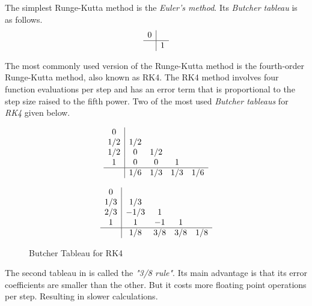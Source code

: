 \documentclass[a4paper,oneside,12pt]{report}
\numberwithin{equation}{chapter}
\begin{document}
The simplest Runge-Kutta method is the \textit{Euler's method}. Its \textit{Butcher tableau} is as follows.
\[ 
    \begin{array} 
        {c|cccc}
        0\\
        \hline
        & 1
    \end{array}
\]


The most commonly used version of the Runge-Kutta method is the fourth-order Runge-Kutta method, also known as RK4. 
The RK4 method involves four function evaluations per step and has an error term that is proportional to the step size raised to the fifth power.
Two of the most used \textit{Butcher tableaus} for \textit{RK4} given below.


\begin{figure}[h!]
    \centering
    \begin{subfigure}{.5\textwidth}
        \[ 
        \begin{array} 
            {c|cccc}
            0\\
            1/2 & 1/2 \\
            1/2 & 0 & 1/2 \\
            1   & 0 & 0 & 1\\
            \hline
            & 1/6 & 1/3 & 1/3 & 1/6
        \end{array}
        \]  
    \end{subfigure}%
    \begin{subfigure}{.5\textwidth}
        \[ 
        \begin{array} 
            {c|cccc}
            0\\
            1/3 & 1/3 \\
            2/3 & -1/3 & 1 \\
            1   & 1 & -1 & 1\\
            \hline
            & 1/8 & 3/8 & 3/8 & 1/8
        \end{array}
        \]  
    \end{subfigure}
    \caption{Butcher Tableau for RK4}
    \label{fig:Butcher-RK4}
\end{figure}

The second tableau in  is called the \textit{"3/8 rule"}. Its main advantage is that its error coefficients are smaller than the other. But it costs more floating point operations per step. 
Resulting in slower calculations. 



\newpage
\end{document}
